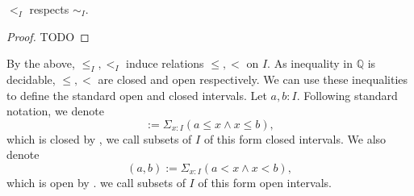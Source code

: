 



\begin{lemma}
  $<_I$ respects $\sim_I$. 
\end{lemma} 
\begin{proof}
  TODO
\end{proof}
\begin{remark}
  By the above, $\leq_I, <_I$ induce relations $\leq,<$ on $I$.
  As inequality in $\mathbb Q$ is decidable, $\leq, <$ are closed and open respectively. 
%
  We can use these inequalities to define the standard open and closed intervals. 
  Let $a,b:I$. 
  Following standard notation, we denote
  \begin{equation}
    [a,b]:= \Sigma_{x:I} (a\leq x \wedge x \leq b),
  \end{equation}
  which is closed by , 
  we call subsets of $I$ of this form closed intervals. 
%
  We also denote 
  \begin{equation}
    (a,b) := \Sigma_{x:I} (a < x \wedge x < b),
  \end{equation}
  which is open by .
  we call subsets of $I$ of this form open intervals. 
\end{remark}

